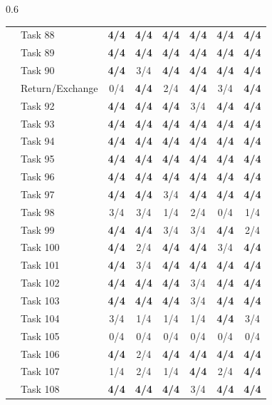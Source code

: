 \begin{table}[t]
\begin{subtable}[t]{0.6\textwidth}
\begin{tabular}{@{}llcccccc@{}}
 & Task 88 & \textbf{4/4} & \textbf{4/4} & \textbf{4/4} & \textbf{4/4} & \textbf{4/4} & \textbf{4/4} \\
 & Task 89 & \textbf{4/4} & \textbf{4/4} & \textbf{4/4} & \textbf{4/4} & \textbf{4/4} & \textbf{4/4} \\
 & Task 90 & \textbf{4/4} & 3/4 & \textbf{4/4} & \textbf{4/4} & \textbf{4/4} & \textbf{4/4} \\
 & Return/Exchange & 0/4 & \textbf{4/4} & 2/4 & \textbf{4/4} & 3/4 & \textbf{4/4} \\
 & Task 92 & \textbf{4/4} & \textbf{4/4} & \textbf{4/4} & 3/4 & \textbf{4/4} & \textbf{4/4} \\
 & Task 93 & \textbf{4/4} & \textbf{4/4} & \textbf{4/4} & \textbf{4/4} & \textbf{4/4} & \textbf{4/4} \\
 & Task 94 & \textbf{4/4} & \textbf{4/4} & \textbf{4/4} & \textbf{4/4} & \textbf{4/4} & \textbf{4/4} \\
 & Task 95 & \textbf{4/4} & \textbf{4/4} & \textbf{4/4} & \textbf{4/4} & \textbf{4/4} & \textbf{4/4} \\
 & Task 96 & \textbf{4/4} & \textbf{4/4} & \textbf{4/4} & \textbf{4/4} & \textbf{4/4} & \textbf{4/4} \\
 & Task 97 & \textbf{4/4} & \textbf{4/4} & 3/4 & \textbf{4/4} & \textbf{4/4} & \textbf{4/4} \\
 & Task 98 & 3/4 & 3/4 & 1/4 & 2/4 & 0/4 & 1/4 \\
 & Task 99 & \textbf{4/4} & \textbf{4/4} & 3/4 & 3/4 & \textbf{4/4} & 2/4 \\
 & Task 100 & \textbf{4/4} & 2/4 & \textbf{4/4} & \textbf{4/4} & 3/4 & \textbf{4/4} \\
 & Task 101 & \textbf{4/4} & 3/4 & \textbf{4/4} & \textbf{4/4} & \textbf{4/4} & \textbf{4/4} \\
 & Task 102 & \textbf{4/4} & \textbf{4/4} & \textbf{4/4} & 3/4 & \textbf{4/4} & \textbf{4/4} \\
 & Task 103 & \textbf{4/4} & \textbf{4/4} & \textbf{4/4} & 3/4 & \textbf{4/4} & \textbf{4/4} \\
 & Task 104 & 3/4 & 1/4 & 1/4 & 1/4 & \textbf{4/4} & 3/4 \\
 & Task 105 & 0/4 & 0/4 & 0/4 & 0/4 & 0/4 & 0/4 \\
 & Task 106 & \textbf{4/4} & 2/4 & \textbf{4/4} & \textbf{4/4} & \textbf{4/4} & \textbf{4/4} \\
 & Task 107 & 1/4 & 2/4 & 1/4 & \textbf{4/4} & 2/4 & \textbf{4/4} \\
 & Task 108 & \textbf{4/4} & \textbf{4/4} & \textbf{4/4} & 3/4 & \textbf{4/4} & \textbf{4/4} \\

\end{tabular}
\end{subtable}
\end{table}

